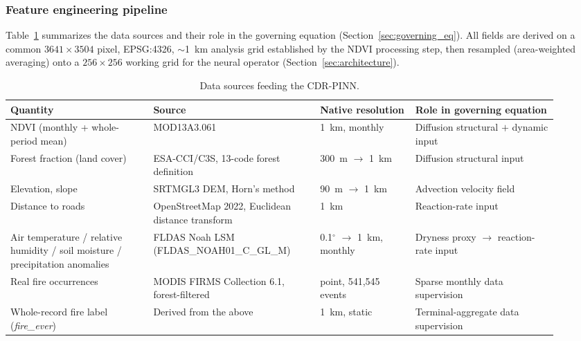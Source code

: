 \documentclass[journal]{IEEEtran}
\begin{document}
\subsubsection{Feature engineering pipeline}
Table~\ref{tab:datasources} summarizes the data sources and their role in the governing equation (Section~\ref{sec:governing_eq}). All fields are derived on a common $3641\times3504$ pixel, EPSG:4326, $\sim$1~km analysis grid established by the NDVI processing step, then resampled (area-weighted averaging) onto a $256\times256$ working grid for the neural operator (Section~\ref{sec:architecture}).

\begin{table}[t]
\centering
\caption{Data sources feeding the CDR-PINN.}
\label{tab:datasources}
\begin{tabular}{p{0.24\linewidth}p{0.28\linewidth}p{0.16\linewidth}p{0.24\linewidth}}
\toprule
\textbf{Quantity} & \textbf{Source} & \textbf{Native resolution} & \textbf{Role in governing equation} \\
\midrule
NDVI (monthly + whole-period mean) & MOD13A3.061 & 1~km, monthly & Diffusion structural $+$ dynamic input \\
Forest fraction (land cover) & ESA-CCI/C3S, 13-code forest definition & 300~m $\to$ 1~km & Diffusion structural input \\
Elevation, slope & SRTMGL3 DEM, Horn's method & 90~m $\to$ 1~km & Advection velocity field \\
Distance to roads & OpenStreetMap 2022, Euclidean distance transform & 1~km & Reaction-rate input \\
Air temperature / relative humidity / soil moisture / precipitation anomalies & FLDAS Noah LSM (FLDAS\_NOAH01\_C\_GL\_M) & 0.1$^{\circ}$ $\to$ 1~km, monthly & Dryness proxy $\to$ reaction-rate input \\
Real fire occurrences & MODIS FIRMS Collection 6.1, forest-filtered & point, 541,545 events & Sparse monthly data supervision \\
Whole-record fire label (\emph{fire\_ever}) & Derived from the above & 1~km, static & Terminal-aggregate data supervision \\
\bottomrule
\end{tabular}
\end{table}
\end{document}
